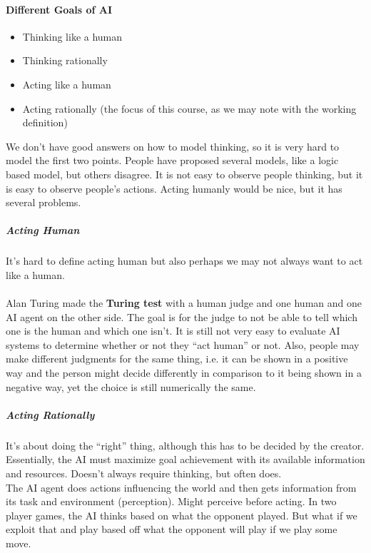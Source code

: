 \documentclass[12 pt]{article}
\begin{document}
            \paragraph{Different Goals of AI}
            \begin{itemize}
            \item Thinking like a human
            \item Thinking rationally
            \item Acting like a human
            \item Acting rationally (the focus of this course, as we
              may note with the working definition)
            \end{itemize}
            We don't have good answers on how to model thinking, so it
            is very hard to model the first two points. People have
            proposed several models, like a logic based model, but
            others disagree. It is not easy to observe people
            thinking, but it is easy to observe people's
            actions. Acting humanly would be nice, but it has several
            problems.
            \subparagraph{Acting Human}
            It's hard to define acting human but also
            perhaps we may not always want to act like a human.
            \paragraph{}Alan Turing made the \textbf{Turing test} with
            a human judge and one human and one AI agent on the other
            side. The goal is for the judge to not be able to tell
            which one is the human and which one isn't. It is still
            not very easy to evaluate AI systems to determine whether
            or not they ``act human'' or not. Also, people may make
            different judgments for the same thing, i.e. it can be
            shown in a positive way and the person might decide
            differently in comparison to it being shown in a negative
            way, yet the choice is still numerically the same. 
            \subparagraph{Acting Rationally}
            It's about doing the ``right'' thing, although this has to
            be decided by the creator. Essentially, the AI must
            maximize goal achievement with its available information
            and resources. Doesn't always require thinking, but often
            does.
            \\ The AI agent does actions influencing the world and
            then gets information from its task and environment
            (perception). Might perceive before acting. In two player
            games, the AI thinks based on what the opponent
            played. But what if we exploit that and play based off
            what the opponent will play if we play some move.
\end{document}
